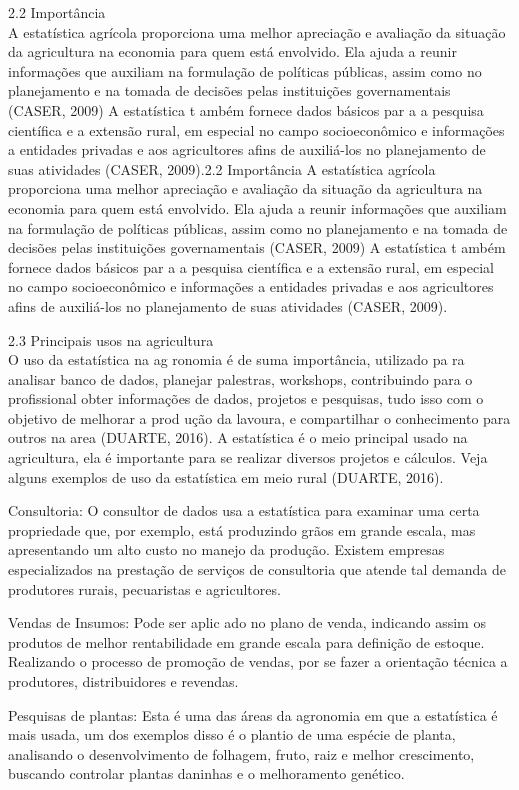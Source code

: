 \documentclass[
]{book}
\theoremstyle{definition}
\theoremstyle{definition}
\theoremstyle{definition}
\theoremstyle{definition}
\theoremstyle{remark}
\begin{document}
2.2 Importância\\
A estatística agrícola proporciona uma melhor apreciação e avaliação da situação da agricultura na economia para quem está envolvido. Ela ajuda a reunir informações que auxiliam na formulação de políticas públicas, assim como no planejamento e na tomada de decisões pelas instituições governamentais (CASER, 2009) A estatística t ambém fornece dados básicos par a a pesquisa científica e a extensão rural, em especial no campo socioeconômico e informações a entidades privadas e aos agricultores afins de auxiliá-los no planejamento de suas atividades (CASER, 2009).2.2 Importância A estatística agrícola proporciona uma melhor apreciação e avaliação da situação da agricultura na economia para quem está envolvido. Ela ajuda a reunir informações que auxiliam na formulação de políticas públicas, assim como no planejamento e na tomada de decisões pelas instituições governamentais (CASER, 2009) A estatística t ambém fornece dados básicos par a a pesquisa científica e a extensão rural, em especial no campo socioeconômico e informações a entidades privadas e aos agricultores afins de auxiliá-los no planejamento de suas atividades (CASER, 2009).

2.3 Principais usos na agricultura\\
O uso da estatística na ag ronomia é de suma importância, utilizado pa ra analisar banco de dados, planejar palestras, workshops, contribuindo para o profissional obter informações de dados, projetos e pesquisas, tudo isso com o objetivo de melhorar a prod ução da lavoura, e compartilhar o conhecimento para outros na area (DUARTE, 2016). A estatística é o meio principal usado na agricultura, ela é importante para se realizar diversos projetos e cálculos. Veja alguns exemplos de uso da estatística em meio rural (DUARTE, 2016).

Consultoria: O consultor de dados usa a estatística para examinar uma certa propriedade que, por exemplo, está produzindo grãos em grande escala, mas apresentando um alto custo no manejo da produção. Existem empresas especializados na prestação de serviços de consultoria que atende tal demanda de produtores rurais, pecuaristas e agricultores.

Vendas de Insumos: Pode ser aplic ado no plano de venda, indicando assim os produtos de melhor rentabilidade em grande escala para definição de estoque. Realizando o processo de promoção de vendas, por se fazer a orientação técnica a produtores, distribuidores e revendas.

Pesquisas de plantas: Esta é uma das áreas da agronomia em que a estatística é mais usada, um dos exemplos disso é o plantio de uma espécie de planta, analisando o desenvolvimento de folhagem, fruto, raiz e melhor crescimento, buscando controlar plantas daninhas e o melhoramento genético.
\end{document}
